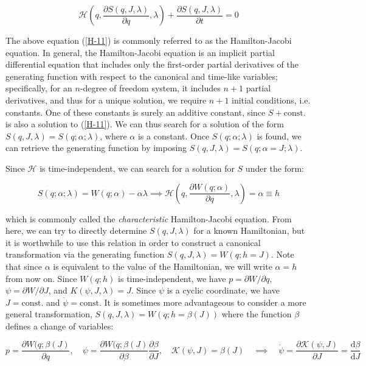 \begin{equation}
    \label{H-11}
    \mathcal{H}\left(q,\frac{\partial S(q,J,\lambda)}{\partial q},\lambda\right)+\frac{\partial S(q,J,\lambda)}{\partial t}=0
\end{equation}

The above equation (\ref{H-11}) is commonly referred to as the Hamilton-Jacobi equation. In general, the Hamilton-Jacobi equation is an implicit partial differential equation that includes only the first-order partial derivatives of the generating function with respect to the canonical and time-like variables; specifically, for an $n$-degree of freedom system, it includes $n+1$ partial derivatives, and thus for a unique solution, we require $n+1$ initial conditions, i.e. constants. One of these constants is surely an additive constant, since $S+\text{const.}$ is also a solution to (\ref{H-11}). We can thus search for a solution of the form $S(q,J,\lambda)=S(q;\alpha;\lambda)$, where $\alpha$ is a constant. Once $S(q;\alpha;\lambda)$ is found, we can retrieve the generating function by imposing $S(q,J,\lambda)=S(q;\alpha=J;\lambda)$.

\vspace*{2.5pt}

\quad Since $\mathcal{H}$ is time-independent, we can search for a solution for $S$ under the form:

\begin{equation}
    \label{H-12}
    S(q;\alpha;\lambda)=W(q;\alpha)-\alpha\lambda\implies\mathcal{H}\left(q,\frac{\partial W(q;\alpha)}{\partial q},\lambda\right)=\alpha\equiv h
\end{equation}

which is commonly called the \textit{characteristic} Hamilton-Jacobi equation. From here, we can try to directly determine $S(q,J,\lambda)$ for a known Hamiltonian, but it is worthwhile to use this relation in order to construct a canonical transformation via the generating function $S(q,J,\lambda)=W(q;h=J)$. Note that since $\alpha$ is equivalent to the value of the Hamiltonian, we will write $\alpha=h$ from now on. Since $W(q;h)$ is time-independent, we have $p=\partial W/\partial q$, $\psi=\partial W/\partial J$, and $K(\psi, J,\lambda)=J$. Since $\psi$ is a cyclic coordinate, we have $J=\text{const.}$ and $\dot{\psi}=\text{const.}$ It is sometimes more advantageous to consider a more general transformation, $S(q,J,\lambda)=W(q;h=\beta(J))$ where the function $\beta$ defines a change of variables:

\begin{equation*}
    p=\frac{\partial W(q;\beta(J)}{\partial q},\quad \psi=\frac{\partial W(q;\beta(J)}{\partial \beta}\frac{\partial \beta}{\partial J},\quad\mathcal{K}(\psi, J)=\beta(J)\quad\implies\quad\dot{\psi}=\frac{\partial\mathcal{K}(\psi,J)}{\partial J}=\frac{\mathrm{d}\beta}{\mathrm{d}J}
\end{equation*}

